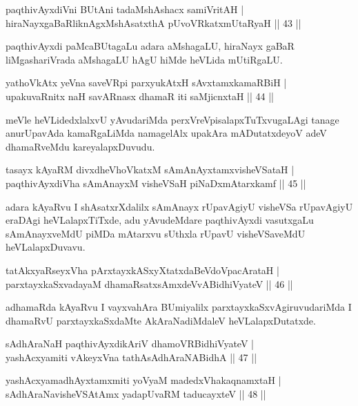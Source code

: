 \begin{shl}
paqthivAyxdiVni BUtAni tadaMshAshacx samiVritAH |\\
hiraNayxgaBaRliknAgxMshAsatxthA pUvoVRkatxmUtaRyaH \hfill || 43 ||
\end{shl}

\begin{artha}
paqthivAyxdi paMcaBUtagaLu adara aMshagaLU, hiraNayx gaBaR liMgashariVrada aMshagaLU hAgU hiMde heVLida mUtiRgaLU.
\end{artha}

\begin{shl}
yathoVkAtx yeVna saveVR\s pi parxyukAtxH sAvxtamxkamaRBiH |\\
upakuvaRnitx naH savARnasx dhamaR iti saMjicnxtaH \hfill || 44 ||
\end{shl}

\begin{artha}
meVle heVLidedxlalxvU yAvudariMda perxVreVpisalapxTuTxvugaLAgi tanage anurUpa\-vAda kamaRgaLiMda namagelAlx upakAra mADutatxdeyoV adeV dhamaRveMdu kareyalapxDuvudu.
\end{artha}

\begin{shl}
tasayx kAyaRM divxdheVhoVkatxM sAmAnAyxtamxvisheVSataH |\\
paqthivAyxdiVha sAmAnayxM visheVSaH piNaDxmAtarxkamf \hfill || 45 ||
\end{shl}

\begin{artha}
adara kAyaRvu I shAsatxrXdalilx sAmAnayx rUpavAgiyU visheVSa rUpavAgiyU eraDAgi heVLalapxTiTxde, adu yAvudeMdare paqthivAyxdi vasutxgaLu sAmAnayxveMdU piMDa mAtarxvu sUthxla rUpavU visheVSaveMdU heVLalapxDuvavu.
\end{artha}

\begin{shl}
tatAkxyaRseyxVha pArxtayxkASxyXtatxdaBeVdoVpacArataH |\\
parxtayxkaSxvadayaM dhamaRsatxsAmxdeVvABidhiVyateV \hfill || 46 ||
\end{shl}

\begin{artha}
adhamaRda kAyaRvu I vayxvahAra BUmiyalilx parxtayxkaSxvAgiruvudariMda I dhamaRvU parxtayxkaSxdaMte AkAraNadiMdaleV heVLalapxDutatxde.
\end{artha}

\begin{shl}
sAdhAraNaH paqthivAyxdikAriV dhamoVR\s BidhiVyateV |\\
yashAcxyamiti vAkeyxVna tathA\s sAdhAraNABidhA \hfill || 47 ||
\end{shl}
\begin{shl}
yashAcxyamadhAyxtamxmiti yoV\s yaM madedxVhakaqnamxtaH |\\
sAdhAraNavisheVSAtAmx yadapUvaRM taducayxteV \hfill || 48 ||
\end{shl}

